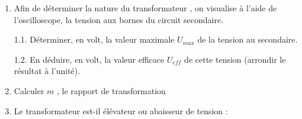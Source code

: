 \documentclass[11pt,a4paper]{article}
\newcommand{\cadreblanc}[1]{%
\medskip\framebox[\linewidth][c]{%
\rule{0mm}{#1mm}}\par
\medskip}
\begin{document}
\begin{enumerate}


\item Afin de déterminer la nature du transformateur , on visualise à l'aide de l'oscilloscope, la tension aux bornes du circuit secondaire. 

\begin{center}
    
\osci[%
scale=1,
second channel=0, %
screen offset one=0, %
screen offset two=0, %
time div=10, %
voltage div one=2, %
voltage div two=2, %
sample rate=200, %
xy mode=0, %
func one=6.8*sin(2*180/0.050*x),
func two=3*sin(2*180/0.020*x+180), %
color one=D62626, %
color two=1053AF, %
graph back color=FFFFFF,
info back color=D6D6D6,
info text color=000000,
main axis color=000000,
grid color=CCCCCC
]

\end{center}


    1.1. Déterminer, en volt, la valeur maximale $U_{max}$ de la tension au secondaire. 

    \cadreblanc{10}

    1.2. En déduire, en volt, la valeur efficace $U_{eff}$ de cette tension (arrondir le résultat à l'unité). 

    \cadreblanc{15}

    \item Calculer $m$ , le rapport de transformation 

    \cadreblanc{15}

    \item Le transformateur est-il élévateur ou abaisseur de tension :

    \vspace{8mm}

    \dotfill 
    


\end{enumerate}

\newpage 
\end{document}
